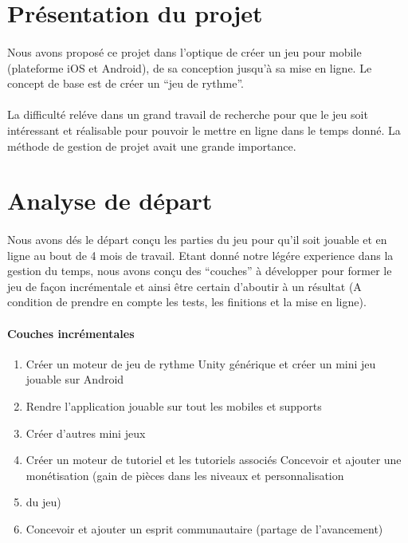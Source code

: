 \section{Présentation du projet}

\paragraph{}
Nous avons proposé ce projet dans l’optique de créer un jeu pour mobile (plateforme iOS et Android), de sa conception jusqu’à sa mise en ligne. Le concept de base est de créer un “jeu de rythme”.

\paragraph{}
La difficulté reléve dans un grand travail de recherche pour que le jeu soit intéressant et réalisable pour pouvoir le mettre en ligne dans le temps donné. La méthode de gestion de projet avait une grande importance.

\section{Analyse de départ}

\paragraph{}
Nous avons dés le départ conçu les parties du jeu pour qu’il soit jouable et en ligne au bout de 4 mois de travail. Etant donné notre légére experience dans la gestion du temps, nous avons conçu des “couches” à développer pour former le jeu de façon incrémentale et ainsi être certain d’aboutir à un résultat (A condition de prendre en compte les tests, les finitions et la mise en ligne). 

\paragraph{Couches incrémentales}
\begin{enumerate}
\item Créer un moteur de jeu de rythme Unity générique et créer un mini jeu jouable sur Android
\item Rendre l’application jouable sur tout les mobiles et supports
\item Créer d’autres mini jeux
\item Créer un moteur de tutoriel et les tutoriels associés
Concevoir et ajouter une monétisation (gain de pièces dans les niveaux et personnalisation \item du jeu)
\item Concevoir et ajouter un esprit communautaire (partage de l’avancement)
\end{enumerate}

